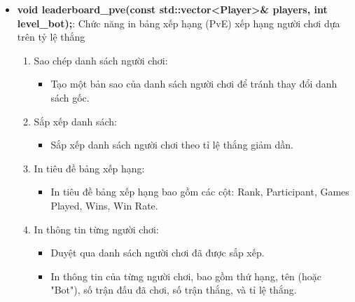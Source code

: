 \documentclass{article}
\begin{document}
\begin{itemize}
    \item \textbf{void leaderboard\_pve(const std::vector<Player>\& players, int level\_bot);}: Chức năng in bảng xếp hạng (PvE) xếp hạng người chơi dựa trên tỷ lệ thắng
    \begin{description}
            \begin{enumerate}
            \item Sao chép danh sách người chơi:
                \begin{itemize}
                    \item Tạo một bản sao của danh sách người chơi để tránh thay đổi danh sách gốc.
                \end{itemize}
            \item Sắp xếp danh sách:
                \begin{itemize}
                    \item Sắp xếp danh sách người chơi theo tỉ lệ thắng giảm dần.
                \end{itemize}
            \item In tiêu đề bảng xếp hạng:
                \begin{itemize}
                    \item In tiêu đề bảng xếp hạng bao gồm các cột: Rank, Participant, Games Played, Wins, Win Rate.
                \end{itemize}
            \item In thông tin từng người chơi:
                \begin{itemize}
                    \item Duyệt qua danh sách người chơi đã được sắp xếp.
                    \item In thông tin của từng người chơi, bao gồm thứ hạng, tên (hoặc "Bot"), số trận đấu đã chơi, số trận thắng, và tỉ lệ thắng.
                \end{itemize}
        \end{enumerate}
    \end{description}
    

\end{itemize}
\end{document}
